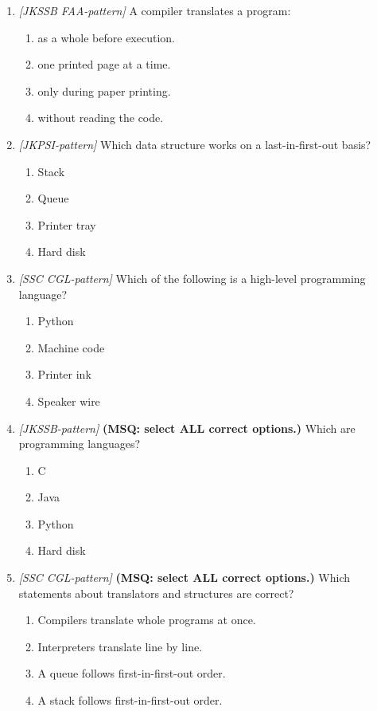 \documentclass[11pt]{article}
\begin{document}
\begin{enumerate}[label=\textbf{Q\arabic*.}, leftmargin=*]
\item \textit{[JKSSB FAA-pattern]} A compiler translates a program:
  \begin{enumerate}[label=\Alph*.]
    \item as a whole before execution.
    \item one printed page at a time.
    \item only during paper printing.
    \item without reading the code.
  \end{enumerate}
\item \textit{[JKPSI-pattern]} Which data structure works on a last-in-first-out basis?
  \begin{enumerate}[label=\Alph*.]
    \item Stack
    \item Queue
    \item Printer tray
    \item Hard disk
  \end{enumerate}
\item \textit{[SSC CGL-pattern]} Which of the following is a high-level programming language?
  \begin{enumerate}[label=\Alph*.]
    \item Python
    \item Machine code
    \item Printer ink
    \item Speaker wire
  \end{enumerate}
\item \textit{[JKSSB-pattern]} \textbf{(MSQ: select ALL correct options.)} Which are programming languages?
  \begin{enumerate}[label=\Alph*.]
    \item C
    \item Java
    \item Python
    \item Hard disk
  \end{enumerate}
\item \textit{[SSC CGL-pattern]} \textbf{(MSQ: select ALL correct options.)} Which statements about translators and structures are correct?
  \begin{enumerate}[label=\Alph*.]
    \item Compilers translate whole programs at once.
    \item Interpreters translate line by line.
    \item A queue follows first-in-first-out order.
    \item A stack follows first-in-first-out order.
  \end{enumerate}
\end{enumerate}
\def\JKSSBLessonID{51}\def\JKSSBAnswers{0}
\end{document}
